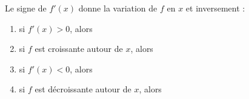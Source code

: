 %	
%
%		



\begin{theorem}
	Le signe de $f'(x)$ donne la variation de $f$ en $x$ et inversement :
		\begin{enumerate}
			\item si $f'(x) > 0$, alors 
			\item si $f$ est croissante autour de $x$, alors 
			\item si $f'(x) < 0$, alors 
			\item si $f$ est décroissante autour de $x$, alors 
		\end{enumerate}
\end{theorem}


